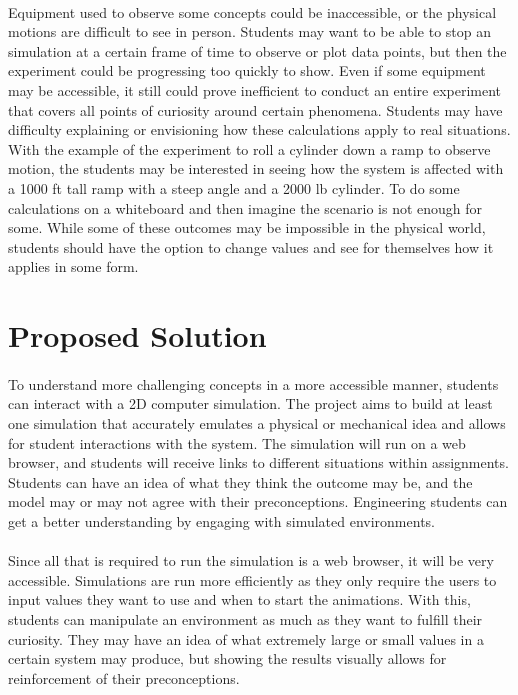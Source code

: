 \documentclass[10pt]{article}
\begin{document}
\paragraph{}Equipment used to observe some concepts could be inaccessible, or the physical motions are difficult to see in person. Students may want to be able to stop an simulation at a certain frame of time to observe or plot data points, but then the experiment could be progressing too quickly to show. Even if some equipment may be accessible, it still could prove inefficient to conduct an entire experiment that covers all points of curiosity around certain phenomena. Students may have difficulty explaining or envisioning how these calculations apply to real situations. With the example of the experiment to roll a cylinder down a ramp to observe motion, the students may be interested in seeing how the system is affected with a 1000 ft tall ramp with a steep angle and a 2000 lb cylinder. To do some calculations on a whiteboard and then imagine the scenario is not enough for some. While some of these outcomes may be impossible in the physical world, students should have the option to change values and see for themselves how it applies in some form.




\section{Proposed Solution}
\paragraph{}To understand more challenging concepts in a more accessible manner, students can interact with a 2D computer simulation. The project aims to build at least one simulation that accurately emulates a physical or mechanical idea and allows for student interactions with the system. The simulation will run on a web browser, and students will receive links to different situations within assignments. Students can have an idea of what they think the outcome may be, and the model may or may not agree with their preconceptions. Engineering students can get a better understanding by engaging with simulated environments.

\paragraph{}Since all that is required to run the simulation is a web browser, it will be very accessible. Simulations are run more efficiently as they only require the users to input values they want to use and when to start the animations. With this, students can manipulate an environment as much as they want to fulfill their curiosity. They may have an idea of what extremely large or small values in a certain system may produce, but showing the results visually allows for reinforcement of their preconceptions.
\end{document}
